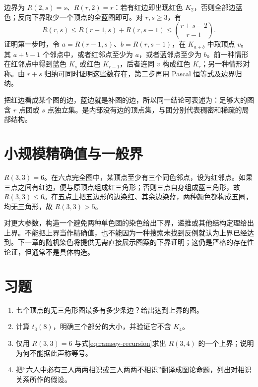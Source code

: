 \documentclass[UTF8,12pt,a4paper,fontset=fandol]{ctexbook}
\begin{document}
边界为 $R(2,s)=s$、$R(r,2)=r$：若有红边即出现红色 $K_2$，否则全部边蓝色；反向下界取少一个顶点的全蓝图即可。对 $r,s\ge3$，有
\begin{equation}
 R(r,s)\le R(r-1,s)+R(r,s-1)
       \le\binom{r+s-2}{r-1}.
 \label{eq:ramsey-recursion}
\end{equation}
证明第一步时，令 $a=R(r-1,s)$、$b=R(r,s-1)$，在 $K_{a+b}$ 中取顶点 $v$。其 $a+b-1$ 个邻点中，或者红邻点至少为 $a$，或者蓝邻点至少为 $b$。前一种情形在红邻点中得到蓝色 $K_s$ 或红色 $K_{r-1}$，后者连同 $v$ 构成红色 $K_r$；另一种情形对称。由 $r+s$ 归纳可同时证明这些数存在，第二步再用 Pascal 恒等式及边界归纳。

把红边看成某个图的边，蓝边就是补图的边，所以同一结论可表述为：足够大的图含 $r$ 点团或 $s$ 点独立集。是内部没有边的顶点集，与团分别代表稠密和稀疏的局部结构。

\section{小规模精确值与一般界}

\begin{example}
$R(3,3)=6$。在六点完全图中，某顶点至少有三个同色邻点，设为红邻点。如果三点之间有红边，便与原顶点组成红三角形；否则三点自身组成蓝三角形，故 $R(3,3)\le6$。在五点上把五边形的边染红、其余边染蓝，两种颜色都构成五圈，均无三角形，故 $R(3,3)>5$。
\end{example}

对更大参数，构造一个避免两种单色团的染色给出下界，递推或其他结构定理给出上界。不能把上界当作精确值，也不能因为一种搜索未找到反例就认为上界已经达到。下一章的随机染色将提供无需直接展示图案的下界证明；这仍是严格的存在性论证，但通常不是具体构造。

\section{习题}
\begin{enumerate}
  \item\label{ex:extremal-ramsey-1} 七个顶点的无三角形图最多有多少条边？给出达到上界的图。
  \item\label{ex:extremal-ramsey-2} 计算 $t_3(8)$，明确三个部分的大小，并验证它不含 $K_4$。
  \item\label{ex:extremal-ramsey-3} 仅用 $R(3,3)=6$ 与式\eqref{eq:ramsey-recursion}求出 $R(3,4)$ 的一个上界；说明为何不能据此声称等号。
  \item\label{ex:extremal-ramsey-4} 把“六人中必有三人两两相识或三人两两不相识”翻译成图论命题，列出对相识关系所作的假设。
\end{enumerate}
\end{document}
